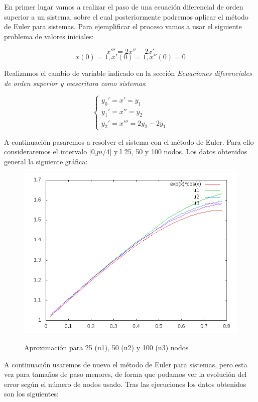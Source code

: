 \documentclass[12pt]{article}       %
\begin{document}
En primer lugar vamos a realizar el paso de una ecuación diferencial de orden superior a un sistema, sobre el cual posteriormente podremos aplicar el método de Euler para sistemas. Para ejemplificar el proceso vamos a usar el siguiente problema de valores iniciales: 

$$
x''' = 2x'' - 2x'     %
$$
$$
x(0)=1, x'(0)=1, x''(0)=0
$$

Realizamos el cambio de variable indicado en la sección \textit{Ecuaciones diferenciales de orden superior y reescritura como sistemas}:

$$
\begin{cases}
y_0' = x' = y_1\\
y_1' = x'' = y_2\\
y_2' = x''' = 2y_2 - 2y_1
\end{cases}
$$

A continuación pasaremos a resolver el sistema con el método de Euler. Para ello consideraremos el intervalo [0,$pi$/4] y l 25, 50 y 100 nodos. Los datos obtenidos general la siguiente gráfica: 

\begin{figure}[H]
\centering
\includegraphics[scale=0.65]{img/graphic.png}
\label{figura1}
\caption{Aproximación para 25 (u1), 50 (u2) y 100 (u3) nodos} 
\end{figure}

A continuación usaremos de nuevo el método de Euler para sistemas, pero esta vez para tamaños de paso menores, de forma que podamos ver la evolución del error según el número de nodos usado. Tras las ejecuciones los datos obtenidos son los siguientes:
\end{document}
